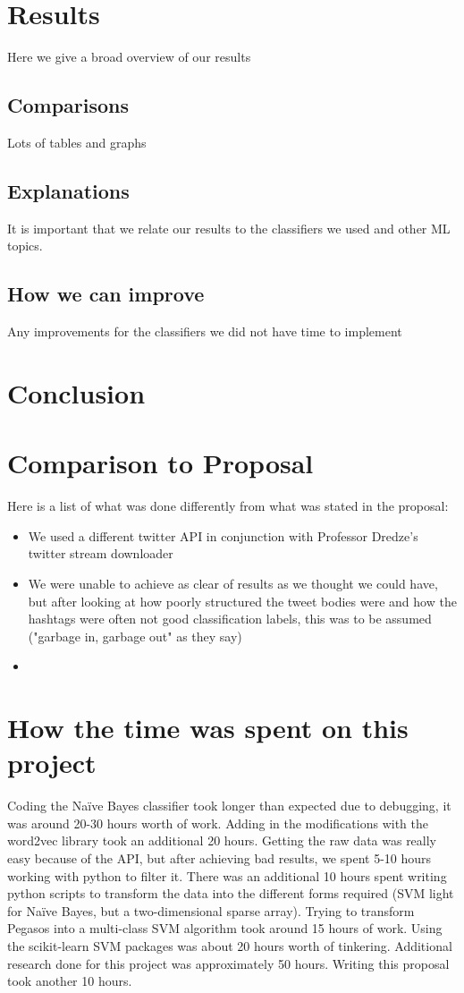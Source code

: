 \documentclass[11pt,letterpaper]{article}
\begin{document}
\section{Results}
Here we give a broad overview of our results

\subsection{Comparisons}
Lots of tables and graphs

\subsection{Explanations}
It is important that we relate our results  to the classifiers we used and other ML topics.

\subsection{How we can improve}
Any improvements for the classifiers we did not have time to implement

\section{Conclusion}

\section*{Comparison to Proposal}
 Here is a list of what was done differently from what was stated in the proposal:
\begin{itemize}
\item We used a different twitter API in conjunction with Professor Dredze's twitter stream downloader
\item We were unable to achieve as clear of results as we thought we could have, but after looking at how poorly structured the tweet bodies were and how the hashtags were often not good classification labels, this was to be assumed ("garbage in, garbage out" as they say)
\item
\end{itemize}

\section*{How the time was spent on this project}
Coding the Na{\"i}ve Bayes classifier took longer than expected due to debugging, it was around 20-30 hours worth of work. Adding in the modifications with the word2vec library took an additional 20 hours. Getting the raw data was really easy because of the API, but after achieving bad results, we spent 5-10 hours working with python to filter it. There was an additional 10 hours spent writing python scripts to transform the data into the different forms required (SVM light for Na{\"i}ve Bayes, but a two-dimensional sparse array). Trying to transform Pegasos into a multi-class SVM algorithm took around 15 hours of work. Using the scikit-learn SVM packages was about 20 hours worth of tinkering. Additional research done for this project was approximately 50 hours. Writing this proposal took another 10 hours.
\end{document}
